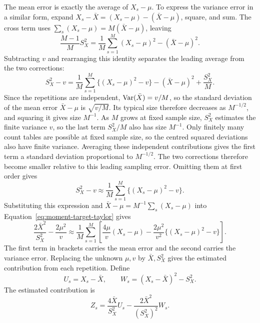 The mean error is exactly the average of \(X_s-\mu\). To express the
variance error in a similar form, expand
\(X_s-\bar X=(X_s-\mu)-(\bar X-\mu)\), square, and sum. The cross
term uses \(\sum_s(X_s-\mu)=M(\bar X-\mu)\), leaving
\begin{equation}
 \frac{M-1}{M}S_X^2
 =\frac1M\sum_{s=1}^M(X_s-\mu)^2-(\bar X-\mu)^2.
 \label{eq:moment-variance-centring}
\end{equation}
Subtracting \(v\) and rearranging this identity separates the leading
average from the two corrections:
\begin{equation*}
 S_X^2-v
 =\frac1M\sum_{s=1}^M\{(X_s-\mu)^2-v\}
   -(\bar X-\mu)^2+\frac{S_X^2}{M}.
\end{equation*}
Since the repetitions are independent, \(\operatorname{Var}(\bar X)=v/M\), so the
standard deviation of the mean error \(\bar X-\mu\) is
\(\sqrt{v/M}\). Its typical size therefore decreases as
\(M^{-1/2}\), and squaring it gives size \(M^{-1}\). As \(M\) grows
at fixed sample size, \(S_X^2\) estimates the finite variance \(v\),
so the last term \(S_X^2/M\) also has size \(M^{-1}\).
Only finitely many count tables are possible at fixed sample size, so the
centred squared deviations also have finite variance. Averaging these
independent contributions gives the first term a standard deviation
proportional to \(M^{-1/2}\). The two corrections therefore become smaller
relative to this leading sampling error.
Omitting them at first order gives
\begin{equation}
 S_X^2-v\approx\frac1M\sum_{s=1}^M\{(X_s-\mu)^2-v\}.
\end{equation}
Substituting this expression and
\(\bar X-\mu=M^{-1}\sum_s(X_s-\mu)\) into
Equation~\eqref{eq:moment-target-taylor} gives
\begin{equation}
 \frac{2\bar X^2}{S_X^2}-\frac{2\mu^2}{v}
 \approx\frac1M\sum_{s=1}^M
 \left[\frac{4\mu}{v}(X_s-\mu)
       -\frac{2\mu^2}{v^2}\{(X_s-\mu)^2-v\}\right].
 \label{eq:moment-target-average-error}
\end{equation}
The first term in brackets carries the mean error and the second carries
the variance error. Replacing the unknown \(\mu,v\) by
\(\bar X,S_X^2\) gives the estimated contribution from each repetition.
Define
\begin{equation}
 U_s=X_s-\bar X,\qquad W_s=(X_s-\bar X)^2-S_X^2.
\end{equation}
The estimated contribution is
\begin{equation}
 Z_s=\frac{4\bar X}{S_X^2}U_s
       -\frac{2\bar X^2}{(S_X^2)^2}W_s.
 \label{eq:moment-df-mc-contribution}
\end{equation}
